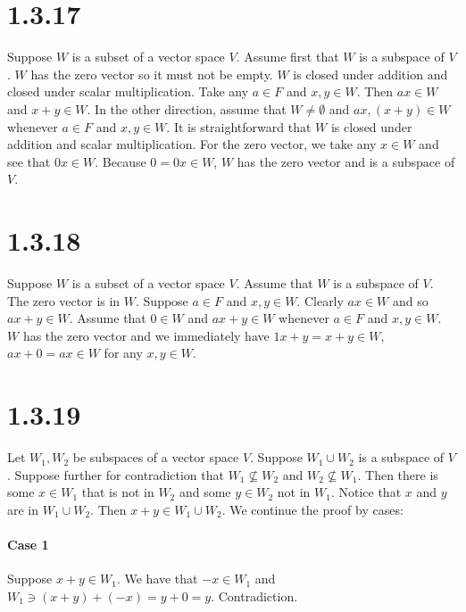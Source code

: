 \documentclass{article}
\begin{document}
\section*{1.3.17}

Suppose \(W\) is a subset of a vector space \(V\). Assume first that \(W\) is a subspace of \(V\). \(W\)
has the zero vector so it must not be empty. \(W\) is closed under
addition and closed under scalar multiplication. Take any \(a \in F\) and \(x, y \in W\). Then \(ax \in W\) and \(x + y \in W\).
In the other direction, assume that \(W \neq \emptyset\) and \(ax, (x+y) \in W\) whenever \(a \in F\) and \(x, y \in W\).
It is straightforward that \(W\) is closed under addition and scalar multiplication. For the zero vector, we take any \(x \in W\)
and see that \(0x \in W\). Because \(0 = 0x \in W\), \(W\) has the zero vector and is a subspace of \(V\). 

\section*{1.3.18}

Suppose \(W\) is a subset of a vector space \(V\). Assume that \(W\) is a subspace of \(V\). The zero vector is in \(W\).
Suppose \(a \in F\) and \(x, y \in W\). Clearly \(ax \in W\) and so \(ax + y \in W\). Assume that \(0 \in W\) and
\(ax + y \in W\) whenever \(a \in F\) and \(x, y \in W\). \(W\) has the zero vector and we immediately have
\(1x + y = x + y \in W\), \(ax + 0 = ax \in W \) for any \(x, y \in W\).

\section*{1.3.19}

Let \(W_{1}, W_{2}\) be subspaces of  a vector space \(V\). Suppose \(W_{1} \cup W_{2}\) is a subspace of \(V\). Suppose further for
contradiction that \(W_{1} \not \subseteq W_{2}\) and \(W_{2} \not \subseteq W_{1}\). Then there is some \(x \in W_{1}\) that is not
in \(W_{2}\) and some \(y \in W_{2}\) not in \(W_{1}\). Notice that \(x\) and \(y\) are in \(W_{1} \cup W_{2}\). 
Then \(x + y \in W_{1} \cup W_{2}\). We continue the proof by cases:

\paragraph{Case 1}
Suppose \(x + y \in W_{1}\). We have that \(-x \in W_{1}\) and \( W_{1} \ni (x + y) + (-x) = y + 0 = y\). Contradiction.
\end{document}
